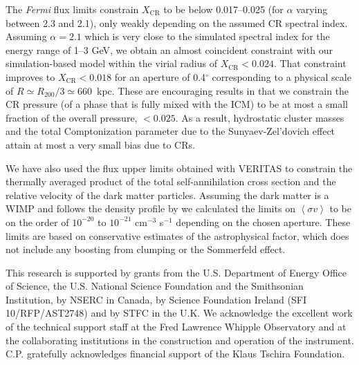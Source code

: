 \documentclass[12pt,manuscript]{aastex}
\def\Fermi{{\em Fermi}\xspace}
\newcommand{\expval}[1]{\left\langle #1 \right\rangle}
\newcommand{\CR}{\mathrm{CR}}
\begin{document}
The \Fermi flux limits constrain $X_\CR$ to be below 0.017--0.025 (for $\alpha$ varying
between 2.3 and 2.1), only weakly depending on the assumed CR spectral index. Assuming $\alpha=2.1$
which is very close to the simulated spectral index for the energy range of 1--3 GeV, we obtain an
almost coincident constraint with our simulation-based model within the virial radius of
$X_\CR<0.024$. That constraint improves to $X_{\CR}<0.018$ for an aperture of 0.4$^\circ$
corresponding to a physical scale of $R \simeq R_{200}/3 \simeq 660$~kpc. These are encouraging
results in that we constrain the CR pressure (of a phase that is fully mixed with the ICM) to be at
most a small fraction of the overall pressure, $<0.025$. As a result, hydrostatic cluster masses
and the total Comptonization parameter due to the Sunyaev-Zel'dovich effect attain at most a very
small bias due to CRs.

We have also used the flux upper limits obtained with VERITAS to constrain the thermally averaged
product of the total self-annihilation cross section and the relative velocity of the dark matter
particles. Assuming the dark matter is a WIMP and follows the density profile by 
\citet{article:NavarroFrenkWhite:1997} we calculated the limits on $\expval{\sigma v}$ to be on the
order of $10^{-20}$ to $10^{-21}$ cm$^{-3}$ s$^{-1}$ depending on the chosen aperture. These limits
are based on conservative estimates of the astrophysical factor, which does not include any boosting
from clumping or the Sommerfeld effect.

\acknowledgments
This research is supported by grants from the U.S. Department of Energy Office of Science, the U.S.
National Science Foundation and the Smithsonian Institution, by NSERC in Canada, by Science
Foundation Ireland (SFI 10/RFP/AST2748) and by STFC in the U.K. We acknowledge the excellent work
of the technical support staff at the Fred Lawrence Whipple Observatory and at the collaborating
institutions in the construction and operation of the instrument. C.P. gratefully acknowledges 
financial support of the Klaus Tschira Foundation.




\end{document}
